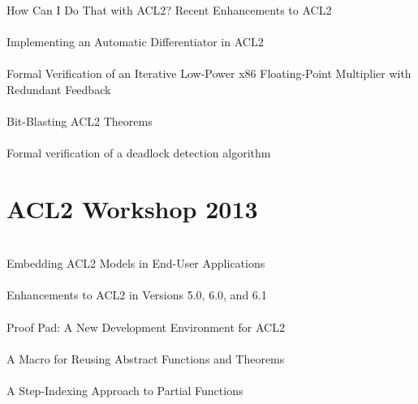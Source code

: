 \documentclass{article}
\begin{document}
\cite{11-kaufmann-enhancements} \\
How Can I Do That with {ACL2}?  Recent Enhancements to {ACL2} \\

\cite{11-reid-differentiator} \\
Implementing an Automatic Differentiator in {ACL2} \\

\cite{11-seidel-fp} \\
Formal Verification of an Iterative Low-Power {x86} Floating-Point Multiplier with Redundant Feedback \\

\cite{11-swords-blasting} \\
Bit-Blasting {ACL2} Theorems \\

\cite{11-verbeek-deadlock} \\
Formal verification of a deadlock detection algorithm \\


\section{ACL2 Workshop 2013}

\cite{13-davis-embedding} \\
Embedding {ACL2} Models in End-User Applications \\

\cite{13-kaufmann-enhancements} \\
Enhancements to {ACL2} in Versions 5.0, 6.0, and 6.1 \\

\cite{13-eggensperger} \\
{Proof Pad}: A New Development Environment for {ACL2} \\

\cite{13-joosten} \\
A Macro for Reusing Abstract Functions and Theorems \\

\cite{13-greve-partial} \\
A Step-Indexing Approach to Partial Functions \\
\end{document}
